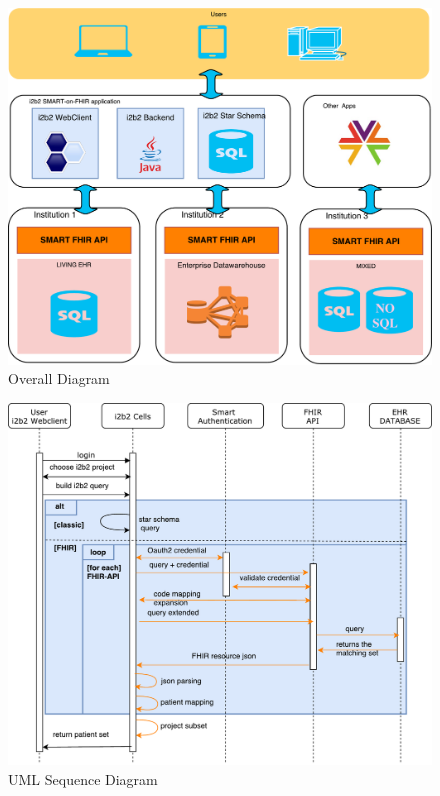 \documentclass{amia}
\begin{document}
\begin{figure}[h]
\centering
\includegraphics[scale=.4]{overall.pdf}
	\caption{Overall Diagram}
\label{overall}
\end{figure}

\begin{figure}[h]
\centering
\includegraphics[scale=.5]{sequence_diagram.pdf}
\caption{UML Sequence Diagram}
\label{seq}
\end{figure}
\end{document}
